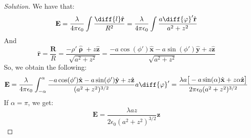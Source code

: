 \documentclass[crop=false,class=article,oneside]{standalone}
\begin{document}
    \begin{proof}[Solution]
        We have that:
        \begin{equation*}
            \mathbf{E}
            =\frac{\lambda}{4\pi\epsilon_{0}}
            \int\frac{\diff{l}\hat{\mathbf{r}}}{R^{2}}
            =\frac{\lambda}{4\pi\epsilon_0}
            \int\frac{a\diff{\varphi}'\hat{\mathbf{r}}}
                     {a^{2}+z^{2}}
        \end{equation*}
        And
        \begin{equation*}
            \hat{\mathbf{r}}=\frac{\mathbf{R}}{R}
            =\frac{-\rho'\hat{\boldsymbol{\uprho}}
            +z\hat{\mathbf{z}}}{\sqrt{a^{2}+z^{2}}}
            =\frac{-a\cos(\phi')\hat{\mathbf{x}}
            -a\sin(\phi')\hat{\mathbf{y}}
            +z\hat{\mathbf{z}}}{\sqrt{a^{2}+z^{2}}}    
        \end{equation*}
        So, we obtain the following:
        \begin{equation*}
            \mathbf{E}
            =\frac{\lambda}{4\pi\epsilon_0}
            \int_{-\alpha}^{\alpha}
            \frac{-a\cos(\phi')\hat{\mathbf{x}}
                  -a\sin(\phi')\hat{\mathbf{y}}
                  +z\hat{\mathbf{z}}}
                 {(a^{2}+z^{2})^{3/2}}a\diff{\varphi}'
            =\frac{\lambda{a}\big[
                       -a\sin(\alpha)\hat{\mathbf{x}}
                       +z\alpha\hat{\mathbf{z}}
                   \big]}
                  {2\pi\epsilon_{0}(a^{2}+z^{2})^{3/2}}
        \end{equation*}
        If $\alpha=\pi$, we get:
        \begin{equation*}
            \mathbf{E}
            =\frac{\lambda az}
                  {2\epsilon_{0}(a^{2}+z^{2})^{3/2}}
            \hat{\mathbf{z}}
        \end{equation*}
    \end{proof}
    \newpage
\end{document}
